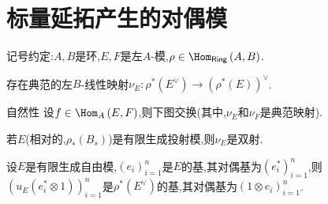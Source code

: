 \section{标量延拓产生的对偶模}

记号约定:$A,B$是环,$E,F$是左$A$-模,$\rho\in\Hom_{\mathsf{Ring}}\left(A,B\right)$.

\begin{proposition}{}{}
	存在典范的左$B$-线性映射$\nu_{E}:\rho^{\ast}\left(E^{\vee}\right)\to\left(\rho^{\ast}\left(E\right)\right)^{\vee}$.
\end{proposition}

\begin{corollary}{自然性}{}
	设$f\in\Hom_{A}\left(E,F\right)$,则下图交换(其中,$\nu_{E}$和$\nu_{F}$是典范映射).
	\begin{center}
	\end{center}
\end{corollary}

\begin{proposition}{}{}
	若$E$(相对的,$\rho_{\ast}\left(B_{s}\right)$)是有限生成投射模,则$\nu_{E}$是双射.
\end{proposition}

\begin{proposition}{}{}
	设$E$是有限生成自由模,$\left(e_{i}\right)_{i=1}^{n}$是$E$的基,其对偶基为$\left(e_{i}^{\ast}\right)_{i=1}^{n}$,则$\left(u_{E}\left(e_{i}^{\ast}\otimes 1\right)\right)_{i=1}^{n}$是$\rho^{\ast}\left(E^{\vee}\right)$的基,其对偶基为$\left(1\otimes e_{i}\right)_{i=1}^{n}$.
\end{proposition}